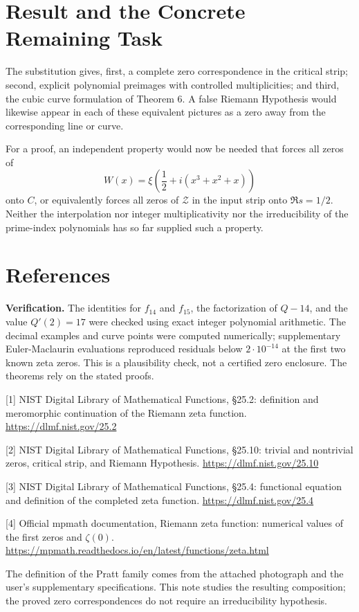 \documentclass[11pt,a4paper]{article}
\newcommand{\Zcal}{\mathcal Z}
\begin{document}
\section{Result and the Concrete Remaining Task}
The substitution gives, first, a complete zero correspondence in the critical strip; second, explicit polynomial preimages with controlled multiplicities; and third, the cubic curve formulation of Theorem 6. A false Riemann Hypothesis would likewise appear in each of these equivalent pictures as a zero away from the corresponding line or curve.

For a proof, an independent property would now be needed that forces all zeros of
\[
 W(x)=\xi\!\left(\frac12+i(x^3+x^2+x)\right)
\]
onto $C$, or equivalently forces all zeros of $\Zcal$ in the input strip onto $\Re s=1/2$. Neither the interpolation nor integer multiplicativity nor the irreducibility of the prime-index polynomials has so far supplied such a property.

\clearpage
\section*{References}
\textbf{Verification.} The identities for $f_{14}$ and $f_{15}$, the factorization of $Q-14$, and the value $Q'(2)=17$ were checked using exact integer polynomial arithmetic. The decimal examples and curve points were computed numerically; supplementary Euler-Maclaurin evaluations reproduced residuals below $2\cdot10^{-14}$ at the first two known zeta zeros. This is a plausibility check, not a certified zero enclosure. The theorems rely on the stated proofs.

[1] NIST Digital Library of Mathematical Functions, \S25.2: definition and meromorphic continuation of the Riemann zeta function. \url{https://dlmf.nist.gov/25.2}

[2] NIST Digital Library of Mathematical Functions, \S25.10: trivial and nontrivial zeros, critical strip, and Riemann Hypothesis. \url{https://dlmf.nist.gov/25.10}

[3] NIST Digital Library of Mathematical Functions, \S25.4: functional equation and definition of the completed zeta function. \url{https://dlmf.nist.gov/25.4}

[4] Official mpmath documentation, Riemann zeta function: numerical values of the first zeros and $\zeta(0)$. \url{https://mpmath.readthedocs.io/en/latest/functions/zeta.html}

The definition of the Pratt family comes from the attached photograph and the user's supplementary specifications. This note studies the resulting composition; the proved zero correspondences do not require an irreducibility hypothesis.
\end{document}
